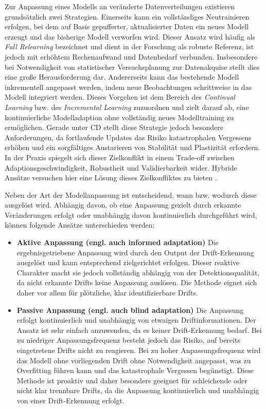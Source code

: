 Zur Anpassung eines Modells an veränderte Datenverteilungen existieren grundsätzlich zwei Strategien. Einerseits kann ein vollständiges Neutrainieren erfolgen, bei dem auf Basis gepufferter, aktualisierter Daten ein neues Modell erzeugt und das bisherige Modell verworfen wird. Dieser Ansatz wird häufig als \emph{Full Relearning} bezeichnet und dient in der Forschung als robuste Referenz, ist jedoch mit erhöhtem Rechenaufwand und Datenbedarf verbunden. Insbesondere bei Notwendigkeit von statistischer Versuchsplanung zur Datenakquise stellt dies eine große Herausforderung dar. 
Andererseits kann das bestehende Modell inkrementell angepasst werden, indem neue Beobachtungen schrittweise in das Modell integriert werden. Dieses Vorgehen ist dem Bereich des \emph{Continual Learning} bzw. des \emph{Incremental Learning} zuzuordnen und zielt darauf ab, eine kontinuierliche Modelladaption ohne vollständig neues Modelltraining zu ermöglichen. Gerade unter \ac{CD} stellt diese Strategie jedoch besondere Anforderungen, da fortlaufende Updates das Risiko katastrophalen Vergessens erhöhen und ein sorgfältiges Austarieren von Stabilität und Plastizität erfordern. In der Praxis spiegelt sich dieser Zielkonflikt in einem Trade-off zwischen Adaptionsgeschwindigkeit, Robustheit und Validierbarkeit wider. Hybride Ansätze versuchen hier eine Lösung dieses Zielkonfliktes zu bieten \cite{gama.2004}. \par
Neben der Art der Modellanpassung ist entscheidend, wann bzw. wodurch diese ausgelöst wird. Abhängig davon, ob eine Anpassung gezielt durch erkannte Veränderungen erfolgt oder unabhängig davon kontinuierlich durchgeführt wird, können folgende Ansätze unterschieden werden:
%
\begin{itemize}
    \item \textbf{Aktive Anpassung (engl. auch informed adaptation)} \newline
    Die ergebnisgetriebene Anpassung wird durch den Output der Drift-Erkennung ausgelöst und kann entsprechend zielgerichtet erfolgen. Dieser reaktive Charakter macht sie jedoch vollständig abhängig von der Detektionsqualität, da nicht erkannte Drifts keine Anpassung auslösen. Die Methode eignet sich daher vor allem für plötzliche, klar identifizierbare Drifts.
    \item \textbf{Passive Anpassung (engl. auch blind adaptation)} \newline
    Die Anpassung erfolgt kontinuierlich und unabhängig von etwaigen Driftinformationen. Der Ansatz ist sehr einfach anzuwenden, da es keiner Drift-Erkennung bedarf. Bei zu niedriger Anpassungsfrequenz besteht jedoch das Risiko, auf bereits eingetretene Drifts nicht zu reagieren. Bei zu hoher Anpassungsfrequenz wird das Modell ohne vorliegenden Drift ohne Notwendigkeit angepasst, was zu Overfitting führen kann und das katastrophale Vergessen begünstigt. Diese Methode ist proaktiv und daher besonders geeignet für schleichende oder nicht klar trennbare Drifts, da die Anpassung kontinuierlich und unabhängig von einer Drift-Erkennung erfolgt.
\end{itemize}
